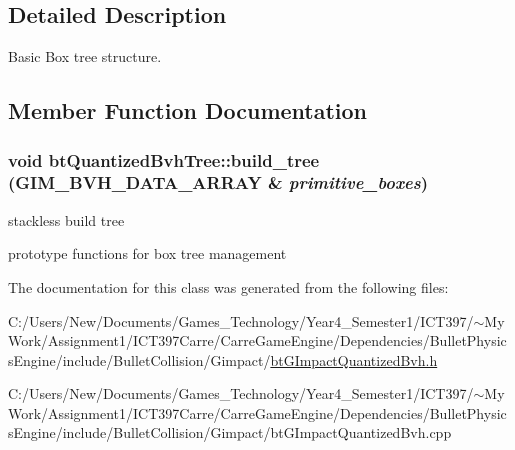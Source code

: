\subsection{Detailed Description}
Basic Box tree structure. 

\subsection{Member Function Documentation}
\hypertarget{classbt_quantized_bvh_tree_a2229fd3e3e2004cdf8151437535e936}{
\subsubsection[build\_\-tree]{\setlength{\rightskip}{0pt plus 5cm}void btQuantizedBvhTree::build\_\-tree (GIM\_\-BVH\_\-DATA\_\-ARRAY \& {\em primitive\_\-boxes})}}
\label{classbt_quantized_bvh_tree_a2229fd3e3e2004cdf8151437535e936}


stackless build tree 

prototype functions for box tree management 

The documentation for this class was generated from the following files:\begin{CompactItemize}
\item 
C:/Users/New/Documents/Games\_\-Technology/Year4\_\-Semester1/ICT397/$\sim$My Work/Assignment1/ICT397Carre/CarreGameEngine/Dependencies/BulletPhysicsEngine/include/BulletCollision/Gimpact/\hyperlink{bt_g_impact_quantized_bvh_8h}{btGImpactQuantizedBvh.h}\item 
C:/Users/New/Documents/Games\_\-Technology/Year4\_\-Semester1/ICT397/$\sim$My Work/Assignment1/ICT397Carre/CarreGameEngine/Dependencies/BulletPhysicsEngine/include/BulletCollision/Gimpact/btGImpactQuantizedBvh.cpp\end{CompactItemize}
